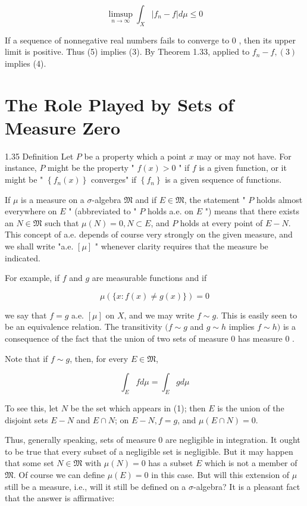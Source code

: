 \documentclass[10pt]{article}
\begin{document}
$$
\limsup _{n \rightarrow \infty} \int_{X}\left|f_{n}-f\right| d \mu \leq 0
$$

If a sequence of nonnegative real numbers fails to converge to 0 , then its upper limit is positive. Thus (5) implies (3). By Theorem 1.33, applied to $f_{n}-f,(3)$ implies (4).

\section{The Role Played by Sets of Measure Zero}
1.35 Definition Let $P$ be a property which a point $x$ may or may not have. For instance, $P$ might be the property " $f(x)>0$ " if $f$ is a given function, or it might be " $\left\{f_{n}(x)\right\}$ converges" if $\left\{f_{n}\right\}$ is a given sequence of functions.

If $\mu$ is a measure on a $\sigma$-algebra $\mathfrak{M}$ and if $E \in \mathfrak{M}$, the statement " $P$ holds almost everywhere on $E$ " (abbreviated to " $P$ holds a.e. on $E$ ") means that there exists an $N \in \mathfrak{M}$ such that $\mu(N)=0, N \subset E$, and $P$ holds at every point of $E-N$. This concept of a.e. depends of course very strongly on the given measure, and we shall write "a.e. $[\mu]$ " whenever clarity requires that the measure be indicated.

For example, if $f$ and $g$ are measurable functions and if

$$
\mu(\{x: f(x) \neq g(x)\})=0
$$

we say that $f=g$ a.e. $[\mu]$ on $X$, and we may write $f \sim g$. This is easily seen to be an equivalence relation. The transitivity $(f \sim g$ and $g \sim h$ implies $f \sim h)$ is a consequence of the fact that the union of two sets of measure 0 has measure 0 .

Note that if $f \sim g$, then, for every $E \in \mathfrak{M}$,

$$
\int_{E} f d \mu=\int_{E} g d \mu
$$

To see this, let $N$ be the set which appears in (1); then $E$ is the union of the disjoint sets $E-N$ and $E \cap N$; on $E-N, f=g$, and $\mu(E \cap N)=0$.

Thus, generally speaking, sets of measure 0 are negligible in integration. It ought to be true that every subset of a negligible set is negligible. But it may happen that some set $N \in \mathfrak{M}$ with $\mu(N)=0$ has a subset $E$ which is not a member of $\mathfrak{M}$. Of course we can define $\mu(E)=0$ in this case. But will this extension of $\mu$ still be a measure, i.e., will it still be defined on a $\sigma$-algebra? It is a pleasant fact that the answer is affirmative:
\end{document}
